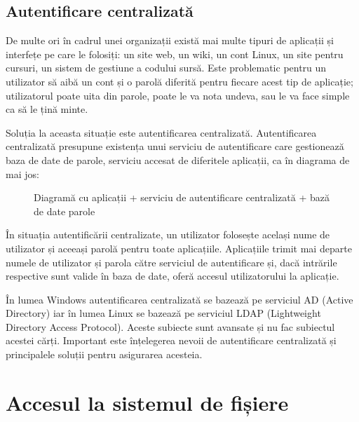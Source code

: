 \subsection{Autentificare centralizată}
\label{sec:users-auth-central}

De multe ori în cadrul unei organizații există mai multe tipuri de aplicații și
interfețe pe care le folosiți: un site web, un wiki, un cont Linux, un site
pentru cursuri, un sistem de gestiune a codului sursă. Este problematic pentru
un utilizator să aibă un cont și o parolă diferită pentru fiecare acest tip de
aplicație; utilizatorul poate uita din parole, poate le va nota undeva, sau le
va face simple ca să le țină minte.

Soluția la aceasta situație este autentificarea centralizată. Autentificarea
centralizată presupune existența unui serviciu de autentificare care gestionează
baza de date de parole, serviciu accesat de diferitele aplicații, ca în diagrama
de mai jos:

\begin{figure}[htbp]
	\centering
	\def\svgwidth{\columnwidth}
	
	\caption{Diagramă cu aplicații + serviciu de autentificare centralizată
		+ bază de date parole}
	\label{fig:user-auth-central}
\end{figure}

În situația autentificării centralizate, un utilizator folosește același nume de
utilizator și aceeași parolă pentru toate aplicațiile. Aplicațiile trimit mai
departe numele de utilizator și parola către serviciul de autentificare și, dacă
intrările respective sunt valide în baza de date, oferă accesul utilizatorului
la aplicație.

În lumea Windows autentificarea centralizată se bazează pe serviciul AD
 (Active Directory) iar în lumea Linux se bazează
pe serviciul LDAP 
(Lightweight Directory Access Protocol). Aceste subiecte sunt avansate și nu fac
subiectul acestei cărți. Important este înțelegerea nevoii de autentificare
centralizată și principalele soluții pentru asigurarea acesteia.

\section{Accesul la sistemul de fișiere}
\label{sec:users-fs}

